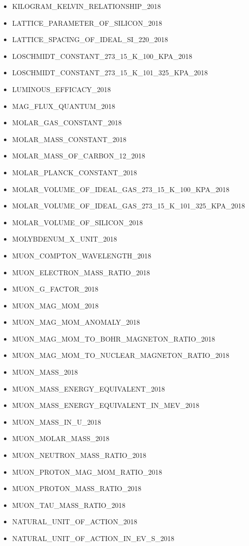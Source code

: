 \begin{itemize}
\item KILOGRAM\_KELVIN\_RELATIONSHIP\_2018
\item LATTICE\_PARAMETER\_OF\_SILICON\_2018
\item LATTICE\_SPACING\_OF\_IDEAL\_SI\_220\_2018
\item LOSCHMIDT\_CONSTANT\_273\_15\_K\_100\_KPA\_2018
\item LOSCHMIDT\_CONSTANT\_273\_15\_K\_101\_325\_KPA\_2018
\item LUMINOUS\_EFFICACY\_2018
\item MAG\_FLUX\_QUANTUM\_2018
\item MOLAR\_GAS\_CONSTANT\_2018
\item MOLAR\_MASS\_CONSTANT\_2018
\item MOLAR\_MASS\_OF\_CARBON\_12\_2018
\item MOLAR\_PLANCK\_CONSTANT\_2018
\item MOLAR\_VOLUME\_OF\_IDEAL\_GAS\_273\_15\_K\_100\_KPA\_2018
\item MOLAR\_VOLUME\_OF\_IDEAL\_GAS\_273\_15\_K\_101\_325\_KPA\_2018
\item MOLAR\_VOLUME\_OF\_SILICON\_2018
\item MOLYBDENUM\_X\_UNIT\_2018
\item MUON\_COMPTON\_WAVELENGTH\_2018
\item MUON\_ELECTRON\_MASS\_RATIO\_2018
\item MUON\_G\_FACTOR\_2018
\item MUON\_MAG\_MOM\_2018
\item MUON\_MAG\_MOM\_ANOMALY\_2018
\item MUON\_MAG\_MOM\_TO\_BOHR\_MAGNETON\_RATIO\_2018
\item MUON\_MAG\_MOM\_TO\_NUCLEAR\_MAGNETON\_RATIO\_2018
\item MUON\_MASS\_2018
\item MUON\_MASS\_ENERGY\_EQUIVALENT\_2018
\item MUON\_MASS\_ENERGY\_EQUIVALENT\_IN\_MEV\_2018
\item MUON\_MASS\_IN\_U\_2018
\item MUON\_MOLAR\_MASS\_2018
\item MUON\_NEUTRON\_MASS\_RATIO\_2018
\item MUON\_PROTON\_MAG\_MOM\_RATIO\_2018
\item MUON\_PROTON\_MASS\_RATIO\_2018
\item MUON\_TAU\_MASS\_RATIO\_2018
\item NATURAL\_UNIT\_OF\_ACTION\_2018
\item NATURAL\_UNIT\_OF\_ACTION\_IN\_EV\_S\_2018

\end{itemize}
